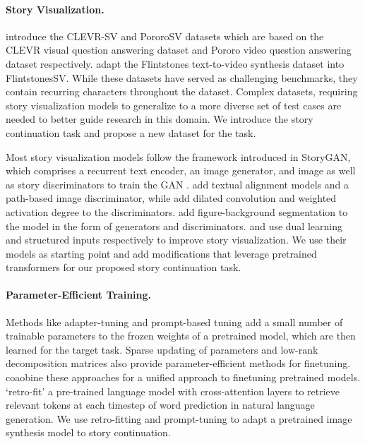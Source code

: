 \documentclass[runningheads]{llncs}
\begin{document}
\paragraph{Story Visualization.}
\cite{li2019storygan} introduce the CLEVR-SV and PororoSV datasets which are based on the CLEVR \cite{johnson2017clevr} visual question answering dataset and Pororo video question answering dataset \cite{kim2017deepstory} respectively. \cite{maharana2021integrating} adapt the Flintstones text-to-video synthesis dataset \cite{gupta2018imagine} into FlintstonesSV. While these datasets have served as challenging benchmarks, they contain recurring characters throughout the dataset. Complex datasets, requiring story visualization models to generalize to a more diverse set of test cases are needed to better guide research in this domain. We introduce the story continuation task and propose a new dataset for the task.

Most story visualization models follow the framework introduced in StoryGAN\cite{li2019storygan}, which comprises a recurrent text encoder, an image generator, and image as well as story discriminators to train the GAN \cite{szHucs2022modular}. \cite{zeng2019pororogan} add textual alignment models and a path-based image discriminator, while \cite{LI2020102956} add dilated convolution and weighted activation degree to the discriminators. \cite{song2020character} add figure-background segmentation to the model in the form of generators and discriminators. \cite{maharana2021improving} and \cite{maharana2021integrating} use dual learning and structured inputs respectively to improve story visualization. We use their models as starting point and add modifications that leverage pretrained transformers for our proposed story continuation task.

\paragraph{Parameter-Efficient Training.}
Methods like adapter-tuning \cite{henderson2021compacter, mahabadi2021parameter, houlsby2019parameter, sung2022vl} and prompt-based tuning \cite{li2021prefix, lester2021power} add a small number of trainable parameters to the frozen weights of a pretrained model, which are then learned for the target task. Sparse updating  of parameters \cite{guo2021parameter, zaken2022bitfit} and low-rank decomposition matrices \cite{hu2021lora} also provide parameter-efficient methods for finetuning. \cite{mao2022unipelt, he2021towards} coaobine these approaches for a unified approach to finetuning pretrained models. \cite{borgeaud2022improving} `retro-fit' a pre-trained language model with cross-attention layers to retrieve relevant tokens at each timestep of word prediction in natural language generation. We use retro-fitting and prompt-tuning to adapt a pretrained image synthesis model to story continuation.
\end{document}

